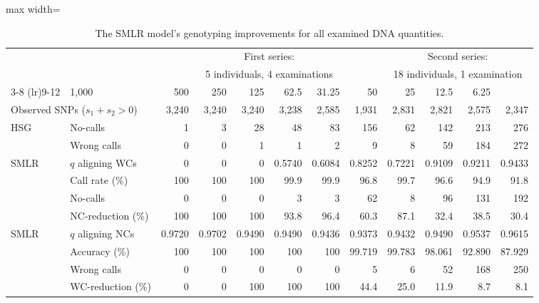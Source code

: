 \begin{table*}
\centering
\caption{The SMLR model’s genotyping improvements for all examined DNA quantities.} 
\label{tab:NC_WC}
\vspace{1mm}
\begin{adjustbox}{max width=\textwidth}
\begin{threeparttable}
\begin{tabular}{llrrrrrrrrrr}
  \toprule[2pt]
\null & \null & \multicolumn{6}{c}{First series:} & \multicolumn{4}{c}{Second series:} \\
\null & \null & \multicolumn{6}{c}{5 individuals, 4 examinations} & \multicolumn{4}{c}{18 individuals, 1 examination} \\
\cmidrule(lr){3-8} \cmidrule(lr){9-12}
\multicolumn{2}{l}{DNA quantity (\si{\pg})} & 1,000 & 500 & 250 & 125 & 62.5 & 31.25 & 50 & 25 & 12.5 & 6.25 \\ 
\multicolumn{2}{l}{Observed SNPs ($s_1\!+\!s_2\!>\!0$)} & 3,240 & 3,240 & 3,240 & 3,238 & 2,585 & 1,931 & 2,831 & 2,821 & 2,575 & 2,347 \\ 
\midrule[2pt]
\multirow{2}{*}{HSG\tnote{$*$}} & No-calls & 1 & 3 & 28 & 48 & 83 & 156 & 62 & 142 & 213 & 276 \\ 
   & Wrong calls & 0 & 0 & 1 & 1 & 2 & 9 & 8 & 59 & 184 & 272 \\ 
\midrule[2pt]
\multirow{4}{*}{SMLR\tnote{$\S$}}  & $q$ aligning WCs\tnote{$\dagger$} & 0 & 0 & 0 & 0.5740 & 0.6084 & 0.8252 & 0.7221 & 0.9109 & 0.9211 & 0.9433 \\ 
\cmidrule(lr){2-12}
   & Call rate (\%) & 100 & 100 & 100 & 99.9 & 99.9 & 96.8 & 99.7 & 96.6 & 94.9 & 91.8 \\ 
   & No-calls & 0 & 0 & 0 & 3 & 3 & 62 & 8 & 96 & 131 & 192 \\ 
\cmidrule(lr){2-12}
   & NC-reduction (\%) & 100 & 100 & 100 & 93.8 & 96.4 & 60.3 & 87.1 & 32.4 & 38.5 & 30.4 \\ 
\midrule[2pt]
\multirow{4}{*}{SMLR\tnote{$\S$}} & $q$ aligning NCs\tnote{$\ddagger$} & 0.9720 & 0.9702 & 0.9490 & 0.9490 & 0.9436 & 0.9373 & 0.9432 & 0.9490 & 0.9537 & 0.9615 \\ 
\cmidrule(lr){2-12}
   & Accuracy (\%) & 100 & 100 & 100 & 100 & 100 & 99.719 & 99.783 & 98.061 & 92.890 & 87.929 \\ 
   & Wrong calls & 0 & 0 & 0 & 0 & 0 & 5 & 6 & 52 & 168 & 250 \\ 
\cmidrule(lr){2-12}
   & WC-reduction (\%) & 0 & 0 & 100 & 100 & 100 & 44.4 & 25.0 & 11.9 & 8.7 & 8.1 \\ 

\end{tabular}
\end{threeparttable}
\end{adjustbox}
\end{table*}
